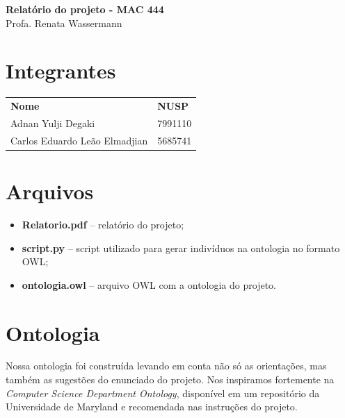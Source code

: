\documentclass[11pt]{article}
\newcommand{\vsp}{\vspace{0.2in}}
\begin{document}
  \begin{minipage}[t]{5in}
    \begin{center}
    {\Large \bf Relatório do projeto - MAC 444\\}
    {\small Profa. Renata Wassermann}
    \end{center}
  \end{minipage}

\vsp \vsp


\section{Integrantes}

\begin{tabular}{ll}
\textbf {Nome} &  \textbf {NUSP} \\
Adnan Yulji Degaki & 7991110 \\
Carlos Eduardo Leão Elmadjian & 5685741 \\
\end{tabular}

\vsp


\section{Arquivos}

\begin{itemize}
	\item \textbf{Relatorio.pdf} -- relatório do projeto;
	\item \textbf{script.py} -- script utilizado para gerar indivíduos na ontologia no formato OWL;
	\item \textbf{ontologia.owl} -- arquivo OWL com a ontologia do projeto.
\end{itemize}

\vsp


\section{Ontologia}
	Nossa ontologia foi construída levando em conta não só as orientações, mas também as sugestões do enunciado do projeto. Nos inspiramos fortemente na \textit{Computer Science Department Ontology}, disponível em um repositório da Universidade de Maryland e recomendada nas instruções do projeto.
	
\end{document}
